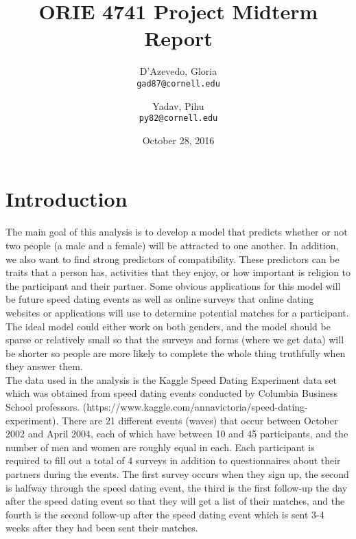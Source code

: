\documentclass{article}
\title{ORIE 4741 Project Midterm Report}
\author{
  D'Azevedo, Gloria\\
  \texttt{gad87@cornell.edu}
  \and
  Yadav, Pihu\\
  \texttt{py82@cornell.edu}
}
\date{October 28, 2016}
\begin{document}
\maketitle



\section{Introduction}
The main goal of this analysis is to develop a model that predicts whether or not two people (a male and a female) will be attracted to one another.  In addition, we also want to find strong predictors of compatibility.  These predictors can be traits that a person has, activities that they enjoy, or how important is religion to the participant and their partner.  Some obvious applications for this model will be future speed dating events as well as online surveys that online dating websites or applications will use to determine potential matches for a participant. The ideal model could either work on both genders, and the model should be sparse or relatively small so that the surveys and forms (where we get data) will be shorter so people are more likely to complete the whole thing truthfully when they answer them.\\

The data used in the analysis is the Kaggle Speed Dating Experiment data set which was obtained from speed dating events conducted by Columbia Business School professors.  (https://www.kaggle.com/annavictoria/speed-dating-experiment). There are 21 different events (waves) that occur between October 2002 and April 2004, each of which have between 10 and 45 participants, and the number of men and women are roughly equal in each.  Each participant is required to fill out a total of 4 surveys in addition to questionnaires about their partners during the events.  The first survey occurs when they sign up, the second is halfway through the speed dating event, the third is the first follow-up the day after the speed dating event so that they will get a list of their matches, and the fourth is the second follow-up after the speed dating event which is sent 3-4 weeks after they had been sent their matches. \\
\end{document}
